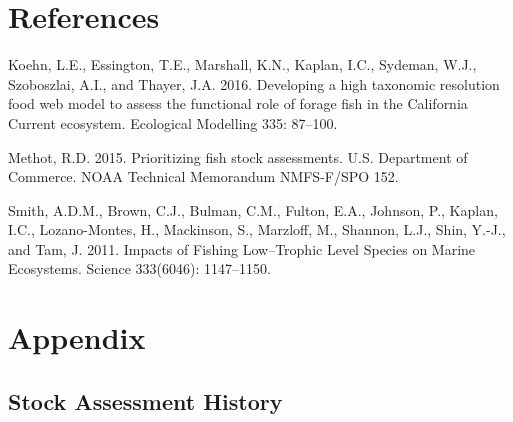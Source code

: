 \documentclass[11pt,
  english,
  a4paper,
]{article}
\newlength{\cslhangindent}
\newenvironment{CSLReferences}[2] %
 {%
  \setlength{\parindent}{0pt}
  \ifodd #1 \everypar{\setlength{\hangindent}{\cslhangindent}}\ignorespaces\fi
  \ifnum #2 > 0
  \setlength{\parskip}{#2\baselineskip}
  \fi
 }%
 {}
\begin{document}
\clearpage


\hypertarget{references}{%
\section{References}\label{references}}

\leavevmode\tagmcend\tagstructend


\hypertarget{refs}{}
\begin{CSLReferences}{1}{0}
\leavevmode{}%
Koehn, L.E., Essington, T.E., Marshall, K.N., Kaplan, I.C., Sydeman, W.J., Szoboszlai, A.I., and Thayer, J.A. 2016. Developing a high taxonomic resolution food web model to assess the functional role of forage fish in the {California} {Current} ecosystem. Ecological Modelling 335: 87--100.

\leavevmode{}%
Methot, R.D. 2015. Prioritizing fish stock assessments. U.S. Department of Commerce. NOAA Technical Memorandum NMFS-F/SPO 152.

\leavevmode{}%
Smith, A.D.M., Brown, C.J., Bulman, C.M., Fulton, E.A., Johnson, P., Kaplan, I.C., Lozano-Montes, H., Mackinson, S., Marzloff, M., Shannon, L.J., Shin, Y.-J., and Tam, J. 2011. Impacts of {Fishing} {Low}--{Trophic} {Level} {Species} on {Marine} {Ecosystems}. Science 333(6046): 1147--1150.

\end{CSLReferences}

\leavevmode\tagmcend\tagstructend

\clearpage


\hypertarget{appendix}{%
\section{Appendix}\label{appendix}}

\leavevmode\tagmcend\tagstructend


\hypertarget{stock-assessment-history}{%
\subsection{Stock Assessment History}\label{stock-assessment-history}}
\end{document}
